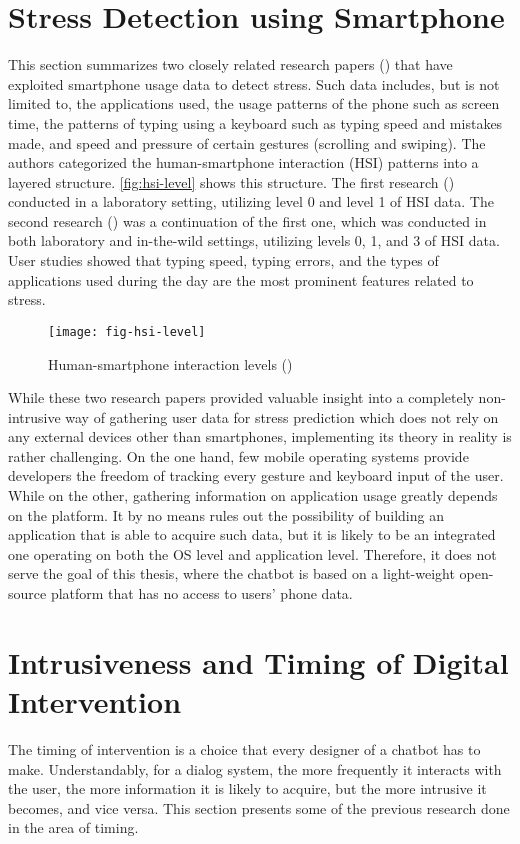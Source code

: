 \section{Stress Detection using Smartphone}
This section summarizes two closely related research papers (\cite{20_ciman, 21_ciman_2}) that have exploited smartphone usage data to detect stress. Such data includes, but is not limited to, the applications used, the usage patterns of the phone such as screen time, the patterns of typing using a keyboard such as typing speed and mistakes made, and speed and pressure of certain gestures (scrolling and swiping). The authors categorized the human-smartphone interaction (HSI) patterns into a layered structure. \autoref{fig:hsi-level} shows this structure. The first research (\cite{20_ciman}) conducted in a laboratory setting, utilizing level 0 and level 1 of HSI data. The second research (\cite{21_ciman_2}) was a continuation of the first one, which was conducted in both laboratory and in-the-wild settings, utilizing levels 0, 1, and 3 of HSI data. User studies showed that typing speed, typing errors, and the types of applications used during the day are the most prominent features related to stress.

\begin{figure}[ht]
  \centering
  \texttt{[image: fig-hsi-level]}
  \caption{Human-smartphone interaction levels (\cite{21_ciman_2})}
  \label{fig:hsi-level}
\end{figure}

While these two research papers provided valuable insight into a completely non-intrusive way of gathering user data for stress prediction which does not rely on any external devices other than smartphones, implementing its theory in reality is rather challenging. On the one hand, few mobile operating systems provide developers the freedom of tracking every gesture and keyboard input of the user. While on the other, gathering information on application usage greatly depends on the platform. It by no means rules out the possibility of building an application that is able to acquire such data, but it is likely to be an integrated one operating on both the OS level and application level. Therefore, it does not serve the goal of this thesis, where the chatbot is based on a light-weight open-source platform that has no access to users' phone data.

\section{Intrusiveness and Timing of Digital Intervention}\label{section:timing}
The timing of intervention is a choice that every designer of a chatbot has to make. Understandably, for a dialog system, the more frequently it interacts with the user, the more information it is likely to acquire, but the more intrusive it becomes, and vice versa. This section presents some of the previous research done in the area of timing.\bigskip

